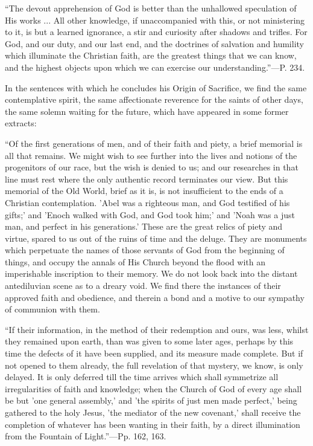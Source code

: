 ``The
devout apprehension of God is better than the unhallowed speculation
of His works ... All other knowledge, if unaccompanied with this, or
not ministering to it, is but a learned ignorance, a stir and
curiosity after shadows and trifles. For God, and our duty, and our
last end, and the doctrines of salvation and humility which
illuminate the Christian faith, are the greatest things that we can
know, and the highest objects upon which we can exercise our
understanding.''—P. 234.

In the sentences with which he concludes his
Origin of Sacrifice, we find the same contemplative spirit, the same
affectionate reverence for the saints of other days, the same solemn
waiting for the future, which have appeared in some former extracts:

``Of
the first generations of men, and of their faith and piety, a brief
memorial is all that remains. We might wish to see further into the
lives and notions of the progenitors of our race, but the wish is
denied to us; and our researches in that line must rest where the only
authentic record terminates our view. But this memorial of the Old
World, brief as it is, is not insufficient to the ends of a Christian
contemplation. 'Abel was a righteous man, and God testified of his
gifts;' and 'Enoch walked with God, and God took him;' and 'Noah was a
just man, and perfect in his generations.' These are the great relics
of piety and virtue, spared to us out of the ruins of time and the
deluge. They are monuments which perpetuate the names of those
servants of God from the beginning of things, and occupy the annals of
His Church beyond the flood with an imperishable inscription to their
memory. We do not look back into the distant antediluvian scene as to
a dreary void. We find there the instances of their approved faith and
obedience, and therein a bond and a motive to our sympathy of
communion with them.

``If
their information, in the method of their redemption and ours, was
less, whilst they remained upon earth, than was given to some later
ages, perhaps by this time the defects of it have been supplied, and
its measure made complete. But if not opened to them already, the full
revelation of that mystery, we know, is only delayed. It is only
deferred till the time arrives which shall symmetrize all
irregularities of faith and knowledge; when the Church of God of every
age shall be but 'one general assembly,' and 'the spirits of just men
made perfect,' being gathered to the holy Jesus, 'the mediator of the
new covenant,' shall receive the completion of whatever has been
wanting in their faith, by a direct illumination from the Fountain of
Light.''—Pp. 162, 163.

